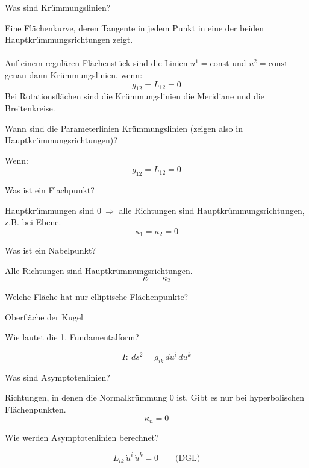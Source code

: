 \documentclass[twocolumn, fontsize=8pt, DIV=1]{scrartcl}
\begin{document}
\begin{framed}
    Was sind Krümmungslinien?
\end{framed}
Eine Flächenkurve, deren Tangente in jedem Punkt in eine der beiden Hauptkrümmungsrichtungen zeigt.\\
\\
Auf einem regulären Flächenstück sind die Linien $u^1 = \text{const}$ und $u^2 = \text{const}$ genau dann Krümmungslinien, wenn:
\[
    g_{12} = L_{12} = 0
\]
Bei Rotationsflächen sind die Krümmungslinien die Meridiane und die Breitenkreise.



\begin{framed}
    Wann sind die Parameterlinien Krümmungslinien (zeigen also in Hauptkrümmungsrichtungen)?
\end{framed}
Wenn:
\[
    g_{12} = L_{12} = 0
\]


\begin{framed}
    Was ist ein Flachpunkt?
\end{framed}
Hauptkrümmungen sind $0\ \Rightarrow$ alle Richtungen sind Hauptkrümmungsrichtungen, z.B. bei Ebene.
\[
    \kappa_1 = \kappa_2 = 0
\]



\begin{framed}
    Was ist ein Nabelpunkt?
\end{framed}
Alle Richtungen sind Hauptkrümmungsrichtungen.
\[
    \kappa_1 = \kappa_2
\]



\begin{framed}
    Welche Fläche hat nur elliptische Flächenpunkte?
\end{framed}
Oberfläche der Kugel



\begin{framed}
    Wie lautet die 1. Fundamentalform?
\end{framed}
\[
    I: \ ds^2 = g_{ik}\, du^i\, du^k
\]



\begin{framed}
    Was sind Asymptotenlinien?
\end{framed}
Richtungen, in denen die Normalkrümmung $0$ ist. Gibt es nur bei hyperbolischen Flächenpunkten.
\[
    \kappa_n = 0
\]



\begin{framed}
    Wie werden Asymptotenlinien berechnet?
\end{framed}
\[
    L_{ik}\,\dot{u}^i\,\dot{u}^k = 0 \qquad \text{(DGL)}
\]
\end{document}
